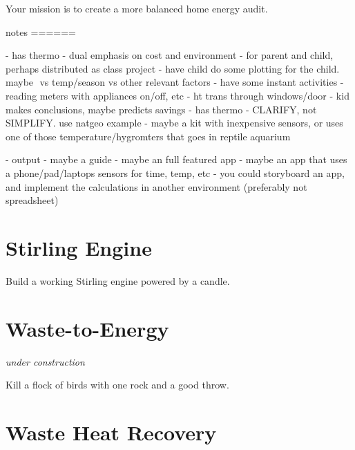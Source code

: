 \documentclass[
]{book}
\newenvironment{Shaded}{\begin{snugshade}}{\end{snugshade}}
\newcommand{\NormalTok}[1]{#1}
\begin{document}
Your mission is to create a more balanced home energy audit.

\begin{Shaded}
\begin{Highlighting}[numbers=left,,]

\NormalTok{notes}
\NormalTok{======}

\NormalTok{{-} has thermo}
\NormalTok{{-} dual emphasis on cost and environment}
\NormalTok{{-} for parent and child, perhaps distributed as class project}
\NormalTok{  {-} have child do some plotting for the child. maybe $$ vs temp/season vs other relevant factors}
\NormalTok{  {-} have some instant activities}
\NormalTok{    {-} reading meters with appliances on/off, etc}
\NormalTok{    {-} ht trans through windows/door}
\NormalTok{  {-} kid makes conclusions, maybe predicts savings}
\NormalTok{{-} has thermo}
\NormalTok{  {-} CLARIFY, not SIMPLIFY. use natgeo example}
\NormalTok{  {-} maybe a kit with inexpensive sensors, or uses one of those temperature/hygromters that goes in reptile aquarium}

\NormalTok{{-} output}
\NormalTok{  {-} maybe a guide}
\NormalTok{  {-} maybe an full featured app}
\NormalTok{  {-} maybe an app that uses a phone/pad/laptop\textquotesingle{}s sensors for time, temp, etc}
\NormalTok{  {-} you could storyboard an app, and implement the calculations in another environment (preferably not spreadsheet)}
  
\end{Highlighting}
\end{Shaded}

\hypertarget{stirling-engine}{%
\chapter{Stirling Engine}\label{stirling-engine}}

Build a working Stirling engine powered by a candle.

\hypertarget{waste-to-energy}{%
\chapter{Waste-to-Energy}\label{waste-to-energy}}

\emph{under construction}

Kill a flock of birds with one rock and a good throw.

\hypertarget{waste-heat-recovery}{%
\chapter{Waste Heat Recovery}\label{waste-heat-recovery}}
\end{document}

